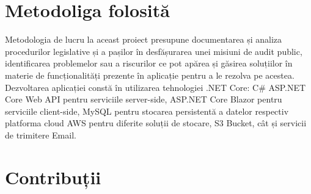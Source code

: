 \section*{Metodoliga folosită}
Metodologia de lucru la aceast proiect presupune documentarea și analiza procedurilor legislative și a pașilor în desfășurarea unei misiuni de audit public, identificarea problemelor sau a riscurilor ce pot apărea și găsirea soluțiilor în materie de funcționalități prezente în aplicație pentru a le rezolva pe acestea. Dezvoltarea aplicației constă în utilizarea tehnologiei .NET Core:
C\# ASP.NET Core Web API pentru serviciile server-side, ASP.NET Core Blazor pentru serviciile client-side, MySQL pentru stocarea persistentă a datelor respectiv platforma cloud AWS pentru diferite soluții de stocare, S3 Bucket, cât și  servicii de trimitere Email.

\section*{Contribuții}

